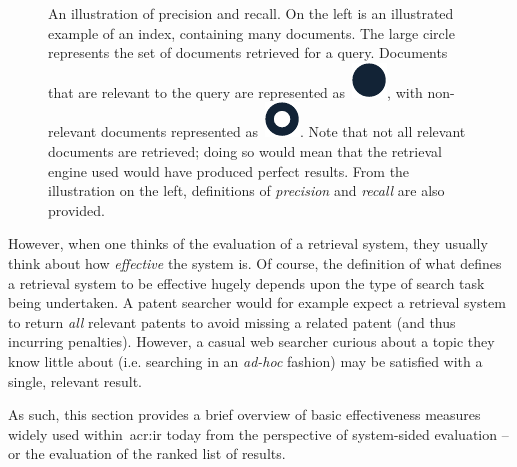 \begin{figure}[t!]
    \centering
    \caption[Precision and recall]{An illustration of precision and recall. On the left is an illustrated example of an index, containing many documents. The large circle represents the set of documents retrieved for a query. Documents that are relevant to the query are represented as~\includegraphics[height=\fontcharht\font`\d]{figures/ch2-pr-r.pdf}, with non-relevant documents represented as~\includegraphics[height=\fontcharht\font`\d]{figures/ch2-pr-nr.pdf}. Note that not all relevant documents are retrieved; doing so would mean that the retrieval engine used would have produced perfect results. From the illustration on the left, definitions of \emph{precision} and \emph{recall} are also provided.}
    \label{fig:pr}
\end{figure}

However, when one thinks of the evaluation of a retrieval system, they usually think about how \emph{effective} the system is. Of course, the definition of what defines a retrieval system to be effective hugely depends upon the type of search task being undertaken. A patent searcher would for example expect a retrieval system to return \emph{all} relevant patents to avoid missing a related patent (and thus incurring penalties). However, a casual web searcher curious about a topic they know little about (i.e. searching in an \emph{ad-hoc} fashion) may be satisfied with a single, relevant result.

As such, this section provides a brief overview of basic effectiveness measures widely used within~\gls{acr:ir} today from the perspective of system-sided evaluation -- or the evaluation of the ranked list of results.

